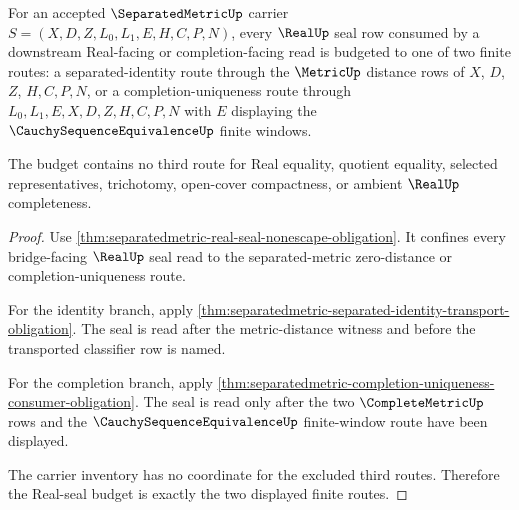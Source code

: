 \begin{theorem}
\label{thm:separatedmetric-real-seal-zero-distance-budget}
For an accepted $\SeparatedMetricUp$ carrier $S=(X,D,Z,L_0,L_1,E,H,C,P,N)$, every $\RealUp$ seal row consumed by a downstream Real-facing or completion-facing read is budgeted to one of two finite routes: a separated-identity route through the $\MetricUp$ distance rows of $X$, $D$, $Z$, $H,C,P,N$, or a completion-uniqueness route through $L_0,L_1,E,X,D,Z,H,C,P,N$ with $E$ displaying the $\CauchySequenceEquivalenceUp$ finite windows.

The budget contains no third route for Real equality, quotient equality, selected representatives, trichotomy, open-cover compactness, or ambient $\RealUp$ completeness.
\end{theorem}
\begin{proof}
Use \autoref{thm:separatedmetric-real-seal-nonescape-obligation}. It confines every bridge-facing $\RealUp$ seal read to the separated-metric zero-distance or completion-uniqueness route.

For the identity branch, apply \autoref{thm:separatedmetric-separated-identity-transport-obligation}. The seal is read after the metric-distance witness and before the transported classifier row is named.

For the completion branch, apply \autoref{thm:separatedmetric-completion-uniqueness-consumer-obligation}. The seal is read only after the two $\CompleteMetricUp$ rows and the $\CauchySequenceEquivalenceUp$ finite-window route have been displayed.

The carrier inventory has no coordinate for the excluded third routes. Therefore the Real-seal budget is exactly the two displayed finite routes.
\end{proof}

